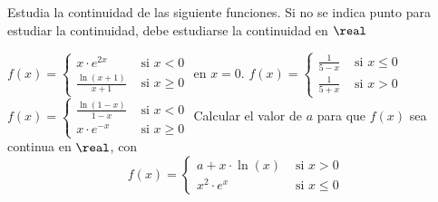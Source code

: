 \begin{problem}
Estudia la continuidad de las siguiente funciones.
\obs Si no se indica punto para estudiar la continuidad, debe estudiarse la continuidad en $\real$

\ppart[17.2-MadA] $f(x) = \begin{cases}\displaystyle x·e^{2x} &\mbox{ si } x<0\\ \displaystyle\frac{\ln(x+1)}{x+1}&\mbox{ si } x\geq 0\end{cases}$ en $x=0$. 
\ppart[16.2-MadB] $f(x) = \begin{cases}\displaystyle\frac{1}{5-x}&\mbox{ si }x\leq0\\\displaystyle\frac{1}{5+x}&\mbox{ si }x>0\end{cases}$
\ppart[16.1-MadA] $f(x) = \begin{cases}\displaystyle\frac{\ln(1-x)}{1-x}&\mbox{ si }x<0\\\displaystyle x·e^{-x}&\mbox{ si }x\geq 0\end{cases}$
\ppart[14.2-MadB] Calcular el valor de $a$ para que $f(x)$ sea continua en $\real$, con  \[f(x) = \begin{cases}a+x·\ln(x)&\mbox{ si }x>0\\\displaystyle x^2·e^x&\mbox{ si }x\leq 0\end{cases}\]

\solution
\end{problem}